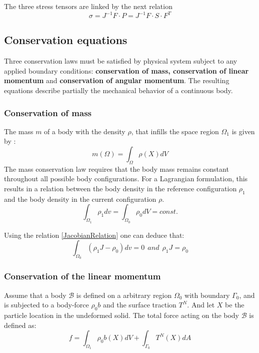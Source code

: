 The three stress tensors are linked by the next relation 
\begin{equation}
\sigma = J^{-1}F \cdot P = J^{-1} F \cdot S \cdot F^T
\label{PK12}
\end{equation}
\subsection{Conservation equations}\label{subsection:conservationequations}
Three conservation laws must be satisfied by physical system subject to any applied boundary conditions: \textbf{conservation of mass, conservation of linear momentum} and \textbf{conservation of angular momentum}. The resulting equations describe partially the mechanical behavior of a continuous body.

\subsubsection*{ Conservation of mass}
The mass $m$ of a body with the density $\rho$, that infills the space region $\Omega_1$ is given by :
\begin{equation}
m(\Omega) = \int_{\Omega} \rho(X)dV
\end{equation}
The mass conservation law requires that the body mass remains constant throughout all possible body configurations. For a Lagrangian formulation, this results in a relation between the body density in the reference configuration $\rho_1$ and the body density in the current configuration $\rho$.
$$\int_{\Omega_1} \rho_1 dv = \int_{\Omega_0} \rho_0 dV = const. $$

Using the relation \ref{JacobianRelation} one can deduce that:
\begin{equation}
\int_{\Omega_0} \left( \rho_1 J - \rho_0\right)dv = 0 \  \ and \  \ \rho_1 J = \rho_0
\end{equation}
\subsubsection*{Conservation of the linear momentum}

Assume that a body $\mathcal{B}$ is defined on a arbitrary region $\Omega_0$ with boundary $\Gamma_0$, and is subjected to a body-force $\rho_0  b$ and the surface traction $T^N$. And let $X$ be the particle location in the undeformed solid.
 The total force acting on the body $\mathcal{B}$ is defined as:
\begin{equation}
f = \int_{\Omega_1}\rho_0 b(X)dV + \int_{\Gamma_0} T^N(X)dA
\end{equation}
 
